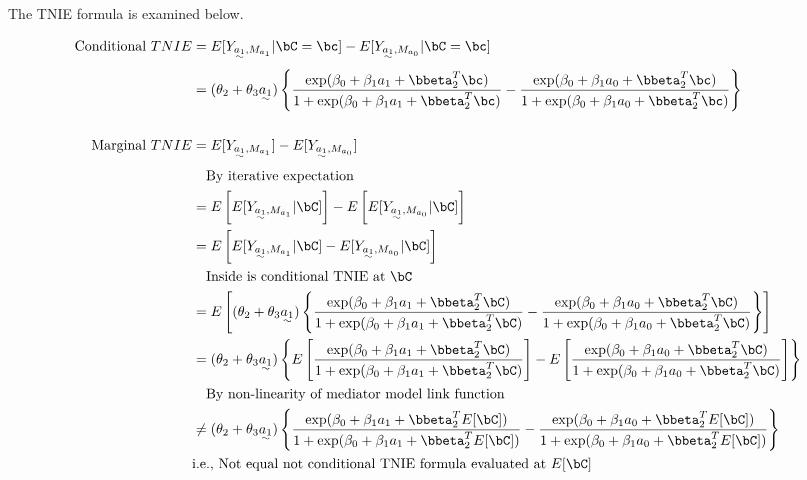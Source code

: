 \documentclass[10pt]{article}
\begin{document}
The TNIE formula is examined below.

\begin{align*}
  \text{Conditional }TNIE
  &= E[Y_{\uwave{a_{1}},M_{a_{1}}} | \bC = \bc] - E[Y_{\uwave{a_{1}},M_{a_{0}}} | \bC = \bc]\\
  &= (\theta_{2} + \theta_{3}\uwave{a_{1}})\left\{
    \frac
    {    \exp(\beta_{0} + \beta_{1}a_{1} + \bbeta_{2}^{T}\bc)}
    {1 + \exp(\beta_{0} + \beta_{1}a_{1} + \bbeta_{2}^{T}\bc)}
    -
    \frac
    {    \exp(\beta_{0} + \beta_{1}a_{0} + \bbeta_{2}^{T}\bc)}
    {1 + \exp(\beta_{0} + \beta_{1}a_{0} + \bbeta_{2}^{T}\bc)}
    \right\}\\
  \\
  \text{Marginal }TNIE
  &= E[Y_{\uwave{a_{1}},M_{a_{1}}}] - E[Y_{\uwave{a_{1}},M_{a_{0}}}]\\
  &~~~\text{By iterative expectation}\\
  &= E \left[ E[Y_{\uwave{a_{1}},M_{a_{1}}} | \bC] \right] - E \left[ E[Y_{\uwave{a_{1}},M_{a_{0}}} | \bC] \right]\\
  &= E \left[ E[Y_{\uwave{a_{1}},M_{a_{1}}} | \bC] - E[Y_{\uwave{a_{1}},M_{a_{0}}} | \bC] \right]\\
  &~~~\text{Inside is conditional TNIE at }\bC\\
  &= E \left[ (\theta_{2} + \theta_{3}\uwave{a_{1}})\left\{
    \frac
    {    \exp(\beta_{0} + \beta_{1}a_{1} + \bbeta_{2}^{T}\bC)}
    {1 + \exp(\beta_{0} + \beta_{1}a_{1} + \bbeta_{2}^{T}\bC)}
    -
    \frac
    {    \exp(\beta_{0} + \beta_{1}a_{0} + \bbeta_{2}^{T}\bC)}
    {1 + \exp(\beta_{0} + \beta_{1}a_{0} + \bbeta_{2}^{T}\bC)}
    \right\} \right]\\
  &= (\theta_{2} + \theta_{3}\uwave{a_{1}})\left\{
    E \left[ \frac
    {    \exp(\beta_{0} + \beta_{1}a_{1} + \bbeta_{2}^{T}\bC)}
    {1 + \exp(\beta_{0} + \beta_{1}a_{1} + \bbeta_{2}^{T}\bC)} \right]
    -
    E \left[ \frac
    {    \exp(\beta_{0} + \beta_{1}a_{0} + \bbeta_{2}^{T}\bC)}
    {1 + \exp(\beta_{0} + \beta_{1}a_{0} + \bbeta_{2}^{T}\bC)} \right]
    \right\}\\
  &~~~\text{By non-linearity of mediator model link function}\\
  &\ne (\theta_{2} + \theta_{3}\uwave{a_{1}})\left\{
    \frac
    {    \exp(\beta_{0} + \beta_{1}a_{1} + \bbeta_{2}^{T}E[\bC])}
    {1 + \exp(\beta_{0} + \beta_{1}a_{1} + \bbeta_{2}^{T}E[\bC])}
    -
    \frac
    {    \exp(\beta_{0} + \beta_{1}a_{0} + \bbeta_{2}^{T}E[\bC])}
    {1 + \exp(\beta_{0} + \beta_{1}a_{0} + \bbeta_{2}^{T}E[\bC])}
    \right\}\\
  &\text{i.e., Not equal not conditional TNIE formula evaluated at }E[\bC]\\
\end{align*}
\end{document}
